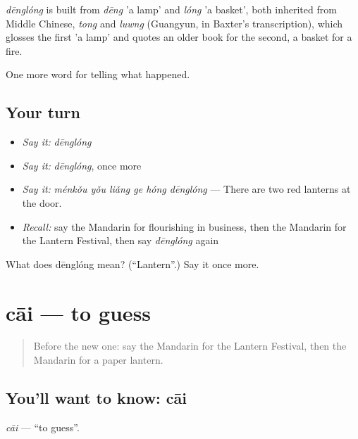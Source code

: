 \begin{cousinweb}
\emph{dēnglóng} is built from \emph{dēng} 'a lamp' and \emph{lóng} 'a basket', both inherited from Middle Chinese, \emph{tong} and \emph{luwng} (Guangyun, in Baxter's transcription), which glosses the first 'a lamp' and quotes an older book for the second, a basket for a fire.
\end{cousinweb}

\begin{grammarlens}[title={What you've built}]
One more word for telling what happened.
\end{grammarlens}

\subsection*{Your turn}
\begin{itemize}
\raggedright
  \item \emph{Say it:} \emph{dēnglóng}
  \item \emph{Say it:} \emph{dēnglóng}, once more
  \item \emph{Say it:} \emph{ménkǒu yǒu liǎng ge hóng dēnglóng} — There are two red lanterns at the door.
  \item \emph{Recall:} say the Mandarin for flourishing in business, then the Mandarin for the Lantern Festival, then say \emph{dēnglóng} again
\end{itemize}

\begin{tcolorbox}[breakable,colback=teal!4,colframe=teal!35!black,title={Before you move on}]
What does dēnglóng mean? (\textquotedblleft{}Lantern\textquotedblright{}.) Say it once more.
\end{tcolorbox}
\section[cāi]{cāi — to guess}

\label{lesson:ZH-C335-cai}



\begin{quote}
Before the new one: say the Mandarin for the Lantern Festival, then the Mandarin for a paper lantern.
\end{quote}

\subsection*{You'll want to know: cāi}
\emph{cāi} — \textquotedblleft{}to guess\textquotedblright{}.


